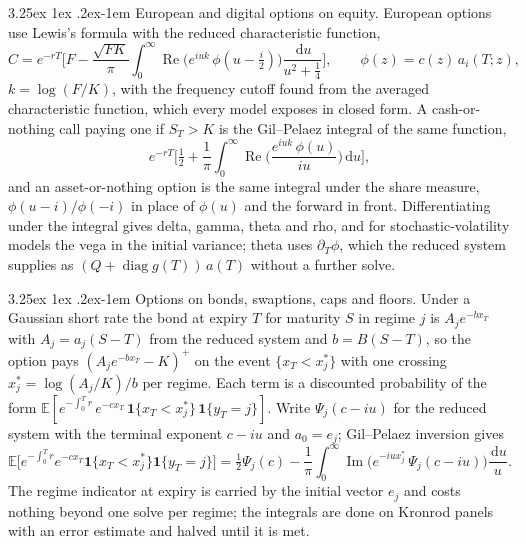 \documentclass[11pt]{article}
\makeatletter
\renewcommand\paragraph{\@startsection{paragraph}{4}{\z@}%
  {3.25ex \@plus1ex \@minus.2ex}{-1em}%
  {\normalfont\normalsize\itshape}}
\theoremstyle{remark}
\newcommand{\E}{\mathbb{E}}
\newcommand{\dd}{\,\mathrm{d}}
\newcommand{\diag}{\operatorname{diag}}
\makeatother
\begin{document}
\paragraph{European and digital options on equity.} European options use Lewis's formula \citep{lewis2001} with
the reduced characteristic function,
\begin{equation}
  C = e^{-rT}\Big[F - \frac{\sqrt{FK}}{\pi}\int_0^\infty \operatorname{Re}\big(e^{iuk}\,\phi(u - \tfrac i2)\big)\frac{\dd u}{u^2 + \tfrac14}\Big],
  \qquad \phi(z) = c(z)\,a_i(T;z),
  \label{eq:lewis}
\end{equation}
$k = \log(F/K)$, with the frequency cutoff found from the averaged characteristic function, which every model
exposes in closed form. A cash-or-nothing call paying one if $S_T > K$ is the Gil--Pelaez integral of the same
function,
\begin{equation}
  e^{-rT}\Big[\tfrac12 + \frac1\pi\int_0^\infty \operatorname{Re}\Big(\frac{e^{iuk}\,\phi(u)}{iu}\Big)\dd u\Big],
  \label{eq:digital}
\end{equation}
and an asset-or-nothing option is the same integral under the share measure, $\phi(u - i)/\phi(-i)$ in place of
$\phi(u)$ and the forward in front. Differentiating under the integral gives delta, gamma, theta and rho, and for
stochastic-volatility models the vega in the initial variance; theta uses $\partial_T\phi$, which the reduced
system supplies as $(Q + \diag g(T))\,a(T)$ without a further solve.

\paragraph{Options on bonds, swaptions, caps and floors.}
Under a Gaussian short rate the bond at expiry $T$ for maturity $S$ in regime $j$ is $A_j e^{-b x_T}$ with
$A_j = a_j(S - T)$ from the reduced system and $b = B(S - T)$, so the option pays $(A_j e^{-bx_T} - K)^+$ on the
event $\{x_T < x^*_j\}$ with one crossing $x^*_j = \log(A_j/K)/b$ per regime. Each term is a discounted
probability of the form $\E[e^{-\int_0^T r}\,e^{-c x_T}\,\mathbf 1\{x_T < x^*_j\}\,\mathbf 1\{y_T = j\}]$. Write
$\Psi_j(c - iu)$ for the reduced system with the terminal exponent $c - iu$ and $a_0 = e_j$; Gil--Pelaez inversion
gives
\begin{equation}
  \E\big[e^{-\int_0^T r} e^{-cx_T}\mathbf 1\{x_T < x^*_j\}\mathbf 1\{y_T = j\}\big]
  = \tfrac12\Psi_j(c) - \frac1\pi\int_0^\infty \operatorname{Im}\big(e^{-iux^*_j}\,\Psi_j(c - iu)\big)\frac{\dd u}{u}.
  \label{eq:gilpelaez}
\end{equation}
The regime indicator at expiry is carried by the initial vector $e_j$ and costs nothing beyond one solve per
regime; the integrals are done on Kronrod panels with an error estimate and halved until it is met.
\end{document}
